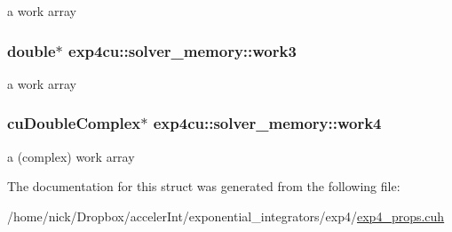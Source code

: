 a work array 

\subsubsection[{\texorpdfstring{work3}{work3}}]{\setlength{\rightskip}{0pt plus 5cm}double$\ast$ exp4cu\+::solver\+\_\+memory\+::work3}\hypertarget{structexp4cu_1_1solver__memory_a1798b2513a1d21e9beaa998f1dc1df89}{}\label{structexp4cu_1_1solver__memory_a1798b2513a1d21e9beaa998f1dc1df89}


a work array 

\subsubsection[{\texorpdfstring{work4}{work4}}]{\setlength{\rightskip}{0pt plus 5cm}cu\+Double\+Complex$\ast$ exp4cu\+::solver\+\_\+memory\+::work4}\hypertarget{structexp4cu_1_1solver__memory_a8b2943ea29259b541a9143409bc8317d}{}\label{structexp4cu_1_1solver__memory_a8b2943ea29259b541a9143409bc8317d}


a (complex) work array 



The documentation for this struct was generated from the following file\+:\begin{DoxyCompactItemize}
\item 
/home/nick/\+Dropbox/acceler\+Int/exponential\+\_\+integrators/exp4/\hyperlink{exp4__props_8cuh}{exp4\+\_\+props.\+cuh}\end{DoxyCompactItemize}
